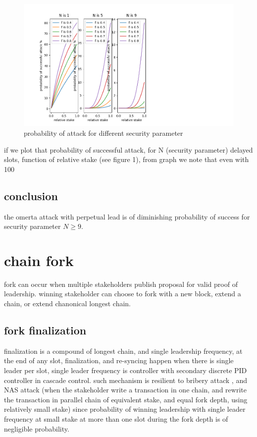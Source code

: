 \documentclass[a4paper]{article}
\begin{document}
\begin{figure}
  \includegraphics{prob.png}
  \caption{probability of attack for different security parameter }
\end{figure}


if we plot that probability of successful attack, for N (security parameter) delayed slots, function of relative stake (see figure 1), from graph we  note that even with 100%

\subsection {conclusion}
the omerta attack with perpetual lead is of diminishing probability of success for security parameter $N \ge 9$.

\section{chain fork}
fork can occur when multiple stakeholders publish proposal for valid proof of leadership.
winning stakeholder can choose to fork with a new block, extend a chain, or extend chanonical longest chain.

\subsection{fork finalization}
finalization is a compound of longest chain, and single leadership frequency, at the end of any slot, finalization, and re-syncing happen when there is single leader per slot, single leader frequency is controller with secondary discrete PID controller in cascade control.
such mechanism is resilient to bribery attack \cite{attack_bribery}, and NAS attack (when the stakeholder write a transaction in one chain, and rewrite the transaction in parallel chain of equivalent stake, and equal fork depth, using relatively small stake) since probability of winning leadership with single leader frequency at small stake at more than one slot during the fork depth  is of negligible probability.
\end{document}
